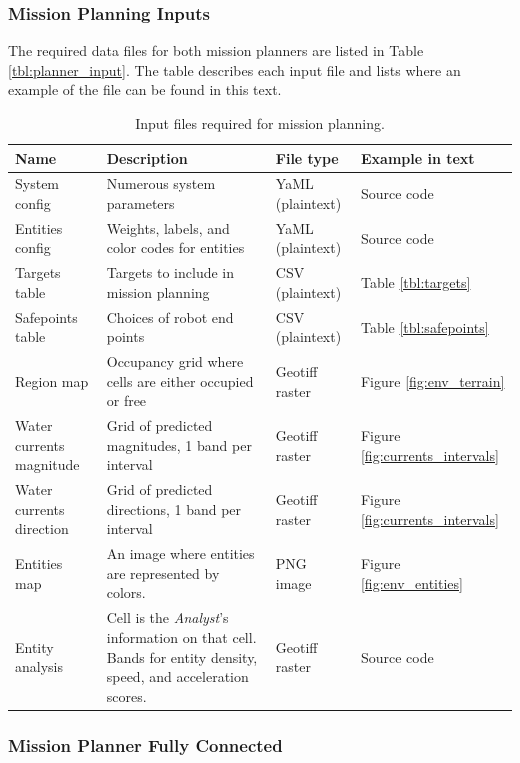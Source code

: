 \documentclass{tamuccthesis}
\begin{document}
\subsubsection{Mission Planning Inputs}

The required data files for both mission planners are listed in Table \ref{tbl:planner_input}. The table describes each input file and lists where an example of the file can be found in this text. 

\begin{table}[H]\small
\begin{tabular}{|p{2.75cm}|p{5cm}|l|l|}
\hline
Name & Description & File type & Example in text \\
\hline
System config    & Numerous system parameters  & YaML (plaintext) & Source code \\
\hline
Entities config  & Weights, labels, and color codes for entities  & YaML (plaintext) & Source code  \\
\hline
Targets table    & Targets to include in mission planning & CSV (plaintext)  & Table \ref{tbl:targets} \\
\hline
Safepoints table & Choices of robot end points & CSV (plaintext)  & Table \ref{tbl:safepoints} \\
\hline
Region map       & Occupancy grid where cells are either occupied or free  & Geotiff raster & Figure \ref{fig:env_terrain} \\
\hline
Water currents magnitude & Grid of predicted magnitudes, 1 band per interval  & Geotiff raster & Figure \ref{fig:currents_intervals} \\
\hline
Water currents direction & Grid of predicted directions, 1 band per interval & Geotiff raster & Figure \ref{fig:currents_intervals} \\
\hline
Entities map & An image where entities are represented by colors. & PNG image & Figure \ref{fig:env_entities} \\
\hline
Entity analysis  & Cell is the \textit{\textit{Analyst}}'s information on that cell. Bands for entity density, speed, and acceleration scores. & Geotiff raster  & Source code  \\ 
\hline
\end{tabular}
\caption[Mission planning input.]{Input files required for mission planning.}
\end{table}


\subsubsection{Mission Planner Fully Connected}
\end{document}

